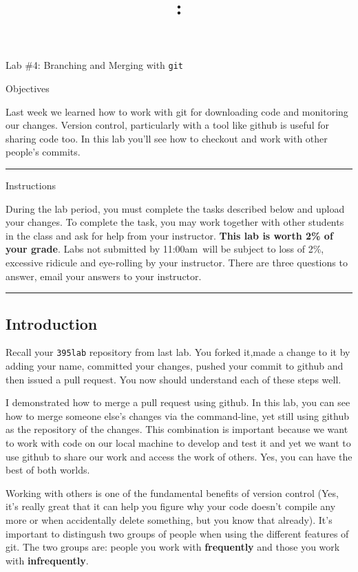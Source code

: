 \documentclass[letterpaper]{article}
\title{\course{}: \activity{}}
\date{}
\newcommand{\activity}{Lab \#4}
\newcommand{\duetime}{11:00am}
\newcommand{\horizrule}{\noindent\rule{\linewidth}{0.15mm}}
\begin{document}
\reversemarginpar

\begin{center}
  \Large{\activity{}: Branching and Merging with {\tt git}}
\end{center}

\begin{center}
  \large{Objectives}
\end{center}

Last week we learned how to work with git for downloading code and monitoring our changes.  Version control, particularly with a tool like github is useful for sharing code too.  In this lab you'll
see how to checkout and work with other people's commits.
\vspace{3mm}\\
\horizrule

\begin{center}
  \large{Instructions}
\end{center}

During the lab period, you must complete the tasks described below and upload your changes.
To complete the task, you may work together with other students in the class and ask for help from your instructor.  {\bf This lab is worth 2\% of your grade}.
Labs not submitted by \duetime~will be subject to loss of 2\%, excessive ridicule
and eye-rolling by your instructor.   There are three questions to answer,
email your answers to your instructor.
\vspace{3mm}\\
\horizrule

\subsection*{Introduction}

Recall your {\tt 395lab} repository from last lab.  You forked it,made a change to it by adding your name, committed your changes, pushed your commit to github and then issued a pull request.  You now should understand each of these steps well.

I demonstrated how to merge a pull request using github.  In this lab, you
can see how to merge someone else's changes via the command-line, yet still
using github as the repository of the changes.  This combination is
important because we want to work with code on our local machine to develop and test it and yet we want to 
use github to share our work and access the work of others.  Yes, you can have the best of both worlds.

Working with others is one of the fundamental benefits of version control (Yes, it's really great that it can help you figure why your code doesn't compile any more or when accidentally delete something, but you know that already).  It's important to distingush two groups of people when using the different features of git.  The two groups are: people you work with {\bf frequently} and those you work with {\bf infrequently}.  
\end{document}
